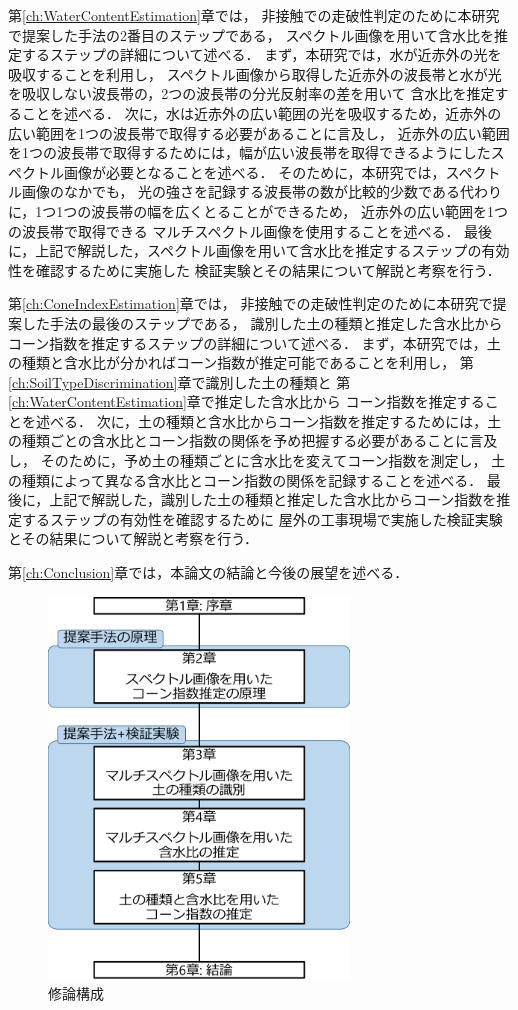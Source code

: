 第\ref{ch:WaterContentEstimation}章では，
非接触での走破性判定のために本研究で提案した手法の2番目のステップである，
スペクトル画像を用いて含水比を推定するステップの詳細について述べる．
まず，本研究では，水が近赤外の光を吸収することを利用し，
スペクトル画像から取得した近赤外の波長帯と水が光を吸収しない波長帯の，2つの波長帯の分光反射率の差を用いて%
含水比を推定することを述べる．
次に，水は近赤外の広い範囲の光を吸収するため，近赤外の広い範囲を1つの波長帯で取得する必要があることに言及し，
近赤外の広い範囲を1つの波長帯で取得するためには，幅が広い波長帯を取得できるようにしたスペクトル画像が必要となることを述べる．
そのために，本研究では，スペクトル画像のなかでも，
光の強さを記録する波長帯の数が比較的少数である代わりに，1つ1つの波長帯の幅を広くとることができるため，
近赤外の広い範囲を1つの波長帯で取得できる
マルチスペクトル画像を使用することを述べる．
最後に，上記で解説した，スペクトル画像を用いて含水比を推定するステップの有効性を確認するために実施した
検証実験とその結果について解説と考察を行う．

第\ref{ch:ConeIndexEstimation}章では，
非接触での走破性判定のために本研究で提案した手法の最後のステップである，
識別した土の種類と推定した含水比からコーン指数を推定するステップの詳細について述べる．
まず，本研究では，土の種類と含水比が分かればコーン指数が推定可能であることを利用し，
第\ref{ch:SoilTypeDiscrimination}章で識別した土の種類と
第\ref{ch:WaterContentEstimation}章で推定した含水比から
コーン指数を推定することを述べる．
次に，土の種類と含水比からコーン指数を推定するためには，土の種類ごとの含水比とコーン指数の関係を予め把握する必要があることに言及し，%
そのために，予め土の種類ごとに含水比を変えてコーン指数を測定し，
土の種類によって異なる含水比とコーン指数の関係を記録することを述べる．
最後に，上記で解説した，識別した土の種類と推定した含水比からコーン指数を推定するステップの有効性を確認するために
屋外の工事現場で実施した検証実験とその結果について解説と考察を行う．

第\ref{ch:Conclusion}章では，本論文の結論と今後の展望を述べる．

\begin{figure}[p]
	\begin{center}
	\centering
	\includegraphics[width=8cm]{./Ch1_Introduction/Fig/thesis_constitution_compressed.pdf}
	\caption{修論構成}\label{fig:MThesisConstitution}
	\end{center}
\end{figure}

\clearpage



